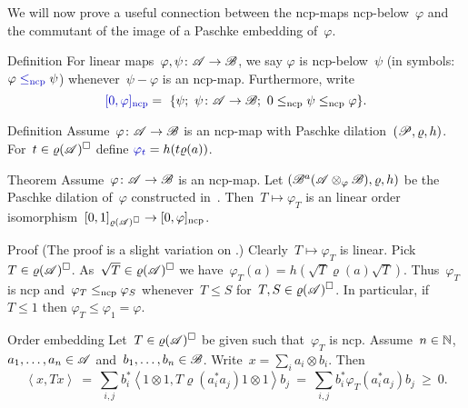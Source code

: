 \documentclass[b]{subfiles}
\begin{document}
\begin{parsec}%
\begin{point}%
We will now prove a useful connection between
    the ncp-maps ncp-below~$\varphi$
    and the commutant of the image of a Paschke embedding of~$\varphi$.
\end{point}
\begin{point}{Definition}%
For linear  maps~$\varphi, \psi\colon \mathscr{A} \to \mathscr{B}$,
    we say $\varphi$ is ncp-below~$\psi$
    (in symbols:~$\varphi \mathrel{\Define{\leq_\ncp}} \psi$)
    whenever~$\psi - \varphi$ is an ncp-map.
    Furthermore, write
    \begin{equation*}
    \Define{[0,\varphi]_\ncp} =\  
        \{\psi; \ \psi \colon \scrA \to \scrB;
            \ 0 \leq_\ncp\psi \leq_\ncp \varphi \}.
    \end{equation*}
\end{point}
\begin{point}{Definition}%
    Assume~$\varphi\colon \mathscr{A} \to \mathscr{B}$ is an ncp-map with Paschke
        dilation~$(\mathscr{P}, \varrho, h)$.
    For~$t \in \varrho(\mathscr{A})^\square$
    define $\Define{\varphi_t} = h(t \varrho(a))$.
\end{point}
\begin{point}{Theorem}%
Assume~$\varphi\colon \mathscr{A} \to \mathscr{B}$ is an ncp-map.
Let $(\mathscr{B}^a(\mathscr{A} \otimes_\varphi \mathscr{B}),
    \varrho, h)$ be the Paschke dilation of~$\varphi$
    constructed in~.
Then~$T \mapsto \varphi_T$ is an linear
order isomorphism~$[0,1]_{\varrho(\mathscr{A})^\square} \to [0,\varphi]_{\mathrm{ncp}}$.
\begin{point}{Proof}
(The proof is a slight variation on \cite[Prop.~5.4]{paschke}.)
Clearly~$T \mapsto \varphi_T$ is linear.
Pick~$T \in \varrho(\mathscr{A})^\square$.
As~$\sqrt{T} \in \varrho(\mathscr{A})^\square$
    we have~$\varphi_T(a) = h(\sqrt{T} \varrho(a)\sqrt{T})$.
    Thus~$\varphi_T$ is ncp
    and~$\varphi_T \mathrel{\leq_{\mathrm{ncp}}} \varphi_S$
    whenever~$T\leq S$ for~$T,S \in \varrho(\mathscr{A})^\square$.
In particular, if~$T\leq 1$ then $\varphi_T \leq \varphi_1 = \varphi$.
\begin{point}{Order embedding}%
Let~$T \in \varrho(\mathscr{A})^\square$
    be given such that~$\varphi_T$ is ncp.
Assume~$n \in \mathbb{N}$, $a_1, \ldots, a_n \in \mathscr{A}$
and~$b_1, \ldots, b_n \in \mathscr{B}$.
Write~$x = \sum_{i} a_i \otimes b_i$.
Then
\begin{equation*}
    \left<x, T x \right>
    \ =\  \sum_{i,j} b_i^* \left< 1\otimes 1, T \varrho(a_i^*a_j) 1 \otimes 1\right> b_j
    \ = \ \sum_{i,j} b_i^* \varphi_T (a_i^*a_j) b_j \ \geq\  0.

\end{equation*}
\end{point}
\end{point}
\end{point}
\end{parsec}
\end{document}
